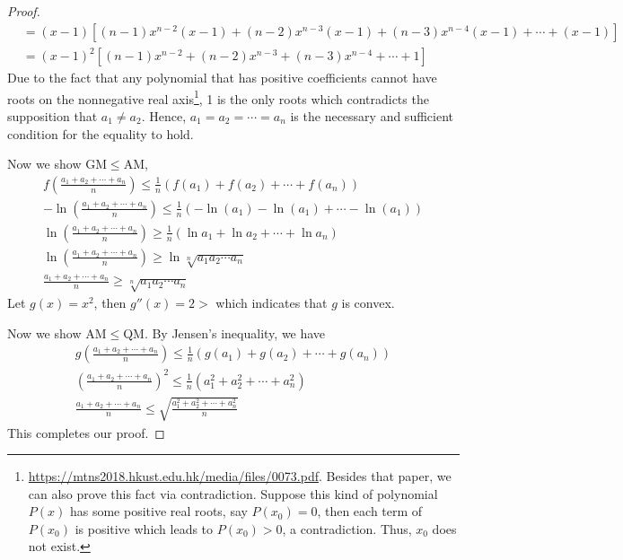 \documentclass{article}
\theoremstyle{remark}
\begin{document}
\begin{proof}
\begin{align*}
   &=(x-1)[(n-1)x^{n-2}(x-1)+(n-2)x^{n-3}(x-1)+(n-3)x^{n-4}(x-1)+\cdots +(x-1)]\\
   &=(x-1)^2[(n-1)x^{n-2}+(n-2)x^{n-3}+(n-3)x^{n-4}+\cdots +1]
\end{align*}
Due to the fact that any polynomial that has positive coefficients cannot have roots on
the nonnegative real axis\footnote{\url{https://mtns2018.hkust.edu.hk/media/files/0073.pdf}. Besides that paper, we can also prove this fact via contradiction. Suppose this kind of polynomial $P(x)$ has some positive real roots, say $P(x_0)=0$, then each term of $P(x_0)$ is positive which leads to $P(x_0)>0$, a contradiction. Thus, $x_0$ does not exist.}, 1 is the only roots which contradicts the supposition that $a_1\neq a_2$. Hence, $a_1=a_2=\cdots=a_n$ is the necessary and sufficient condition for the equality to hold. 

Now we show GM$\le$AM,
\begin{gather*}
f(\frac{a_1+a_2+\cdots+a_n}{n})\le \frac{1}{n}\left(f(a_1)+f(a_2)+\cdots +f(a_n)\right)\\
-\ln(\frac{a_1+a_2+\cdots+a_n}{n})\le \frac{1}{n}\left(-\ln(a_1)-\ln(a_1)+\cdots -\ln(a_1)\right)\\
\ln(\frac{a_1+a_2+\cdots+a_n}{n})\ge \frac{1}{n}(\ln a_1 +\ln a_2 +\cdots+ \ln a_n)\\
\ln(\frac{a_1+a_2+\cdots+a_n}{n})\ge \ln\sqrt[n]{a_1a_2\cdots a_n}\\
\frac{a_1+a_2+\cdots+a_n}{n}\ge \sqrt[n]{a_1a_2\cdots a_n}
\end{gather*}
Let $g(x)=x^2$, then $g''(x)=2>$ which indicates that $g$ is convex.

Now we show AM$\le$QM. By Jensen's inequality, we have
\begin{gather*}
g(\frac{a_1+a_2+\cdots+a_n}{n})\le \frac{1}{n}\left(g(a_1)+g(a_2)+\cdots +g(a_n)\right)\\
(\frac{a_1+a_2+\cdots+a_n}{n})^2\le \frac{1}{n}(a_1^2+a_2^2+\cdots +a_n^2)\\
\frac{a_1+a_2+\cdots+a_n}{n}\le \sqrt{\frac{a_1^2+a_2^2+\cdots +a_n^2}{n}}
\end{gather*}
This completes our proof.
\end{proof} 
\end{document}
